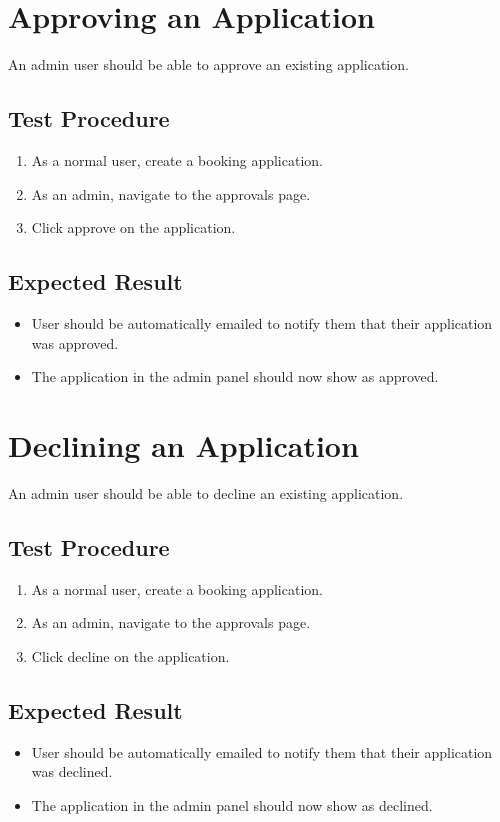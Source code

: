 \documentclass[a4paper, draft]{article}
\begin{document}
\newpage
\section{Approving an Application}
An admin user should be able to approve an existing application.

\subsection{Test Procedure}
\begin{enumerate}
    \item As a normal user, create a booking application.
    \item As an admin, navigate to the approvals page.
    \item Click approve on the application.
\end{enumerate}

\subsection{Expected Result}
\begin{itemize}
    \item User should be automatically emailed to notify them that their application was approved.
    \item The application in the admin panel should now show as approved.
\end{itemize}

\section{Declining an Application}
An admin user should be able to decline an existing application.

\subsection{Test Procedure}
\begin{enumerate}
    \item As a normal user, create a booking application.
    \item As an admin, navigate to the approvals page.
    \item Click decline on the application.
\end{enumerate}

\subsection{Expected Result}
\begin{itemize}
    \item User should be automatically emailed to notify them that their application was declined.
    \item The application in the admin panel should now show as declined.
\end{itemize}
\end{document}
